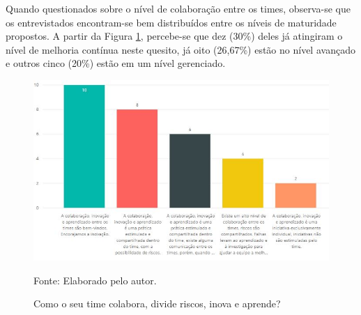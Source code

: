 \documentclass[twoside,english,brazilian]{UNISINOSartigo}
\newcommand{\source}[1]{\caption*{Fonte: {#1}} }
\begin{document}
Quando questionados sobre o nível de colaboração entre os times, observa-se que os entrevistados encontram-se bem distribuídos entre os níveis de maturidade propostos. A partir da Figura \ref{fig:colaboracaoInovacao}, percebe-se que dez (30\%) deles já atingiram o nível de melhoria contínua neste quesito, já oito (26,67\%) estão no nível avançado e outros cinco (20\%) estão em um nível gerenciado. 
\begin{figure}[H]
    \centering
    \caption{Como o seu time colabora, divide riscos, inova e aprende?}
       \includegraphics[scale=.6]{imagens/colaboracaoInovacao.JPG}
        \source{Elaborado pelo autor.}
    \label{fig:colaboracaoInovacao}
\end{figure}
\end{document}
